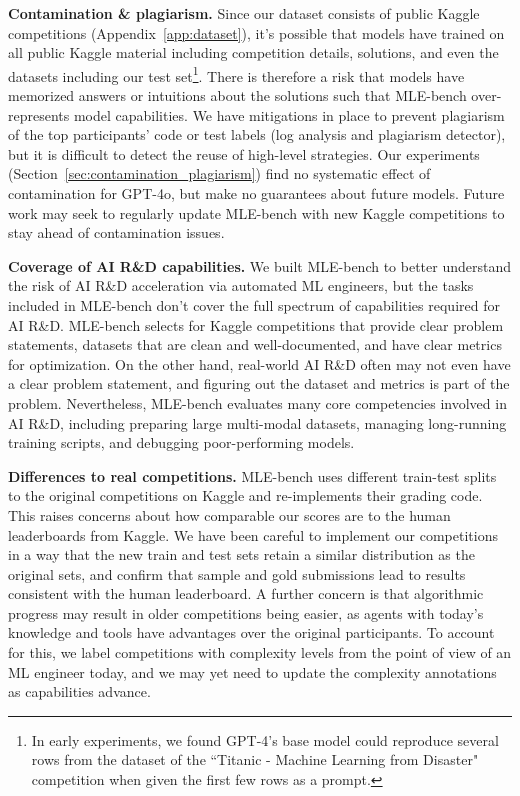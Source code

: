 \documentclass{article} %
\begin{document}
\textbf{Contamination \& plagiarism.} Since our dataset consists of public Kaggle competitions (Appendix~\ref{app:dataset}), it's possible that models have trained on all public Kaggle material including competition details, solutions, and even the datasets including our test set\footnote{In early experiments, we found GPT-4's base model could reproduce several rows from the dataset of the ``Titanic - Machine Learning from Disaster" competition when given the first few rows as a prompt.}. There is therefore a risk that models have memorized answers or intuitions about the solutions such that MLE-bench over-represents model capabilities. We have mitigations in place to prevent plagiarism of the top participants’ code or test labels (log analysis and plagiarism detector), but it is difficult to detect the reuse of high-level strategies. Our experiments (Section~\ref{sec:contamination_plagiarism}) find no systematic effect of contamination for GPT-4o, but make no guarantees about future models. Future work may seek to regularly update MLE-bench with new Kaggle competitions to stay ahead of contamination issues.

\textbf{Coverage of AI R\&D capabilities.} We built MLE-bench to better understand the risk of AI R\&D acceleration via automated ML engineers, but the tasks included in MLE-bench don't cover the full spectrum of capabilities required for AI R\&D. MLE-bench selects for Kaggle competitions that provide clear problem statements, datasets that are clean and well-documented, and have clear metrics for optimization. On the other hand, real-world AI R\&D often may not even have a clear problem statement, and figuring out the dataset and metrics is part of the problem. Nevertheless, MLE-bench evaluates many core competencies involved in AI R\&D, including preparing large multi-modal datasets, managing long-running training scripts, and debugging poor-performing models.

\textbf{Differences to real competitions.} MLE-bench uses different train-test splits to the original competitions on Kaggle and re-implements their grading code. This raises concerns about how comparable our scores are to the human leaderboards from Kaggle. We have been careful to implement our competitions in a way that the new train and test sets retain a similar distribution as the original sets, and confirm that sample and gold submissions lead to results consistent with the human leaderboard. A further concern is that algorithmic progress may result in older competitions being easier, as agents with today's knowledge and tools have advantages over the original participants. To account for this, we label competitions with complexity levels from the point of view of an ML engineer today, and we may yet need to update the complexity annotations as capabilities advance.
\end{document}

